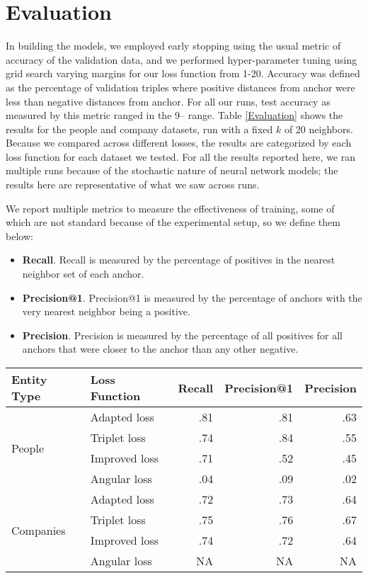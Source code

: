 \section{Evaluation}
\label{results}
In building the models, we employed early stopping using the usual metric of accuracy of the validation data, and we performed hyper-parameter tuning using grid search varying margins for our loss function from 1-20.  Accuracy was defined as the percentage of validation triples where positive distances from anchor were less than negative distances from anchor.  For all our runs, test accuracy as measured by this metric ranged in the 9-- range.  Table \ref{Evaluation} shows the results for the people and company datasets, run with a fixed $k$ of 20 neighbors.  Because we compared across different losses, the results are categorized by each loss function for each dataset we tested.  For all the results reported here, we ran multiple runs because of the stochastic nature of neural network models; the results here are representative of what we saw across runs. 

We report multiple metrics to measure the effectiveness of training, some of which are not standard because of the experimental setup, so we define them below:
\begin{itemize}
\item \textbf{Recall}.  Recall is measured by the percentage of positives in the nearest neighbor set of each anchor.
\item \textbf{Precision@1}.  Precision@1 is measured by the percentage of anchors with the very nearest neighbor being a positive.
\item \textbf{Precision}.  Precision is measured by the percentage of all positives for all anchors that were closer to the anchor than any other negative.
\end{itemize}
 
\begin{table*}[ht]
\caption{Precision and Recall for people and companies by loss functions}
\label{Evaluation}
\begin{tabular}{l|l|r|r|r|}
\hline
Entity Type & Loss Function & Recall & Precision@1 & Precision \\
\hline
\multirow{4}{*}{People} & Adapted loss & .81 & .81 & .63 \\
\hline
& Triplet loss & .74 & .84 & .55 \\
\hline
& Improved loss & .71 & .52 & .45 \\
\hline
& Angular loss & .04 & .09 & .02 \\
\hline
\multirow{4}{*}{Companies} & Adapted loss & .72 & .73 & .64 \\
& Triplet loss & .75 & .76 & .67 \\
\hline
& Improved loss & .74 & .72 & .64 \\
\hline
& Angular loss & NA & NA & NA \\
\hline
\end{tabular}
\end{table*}


